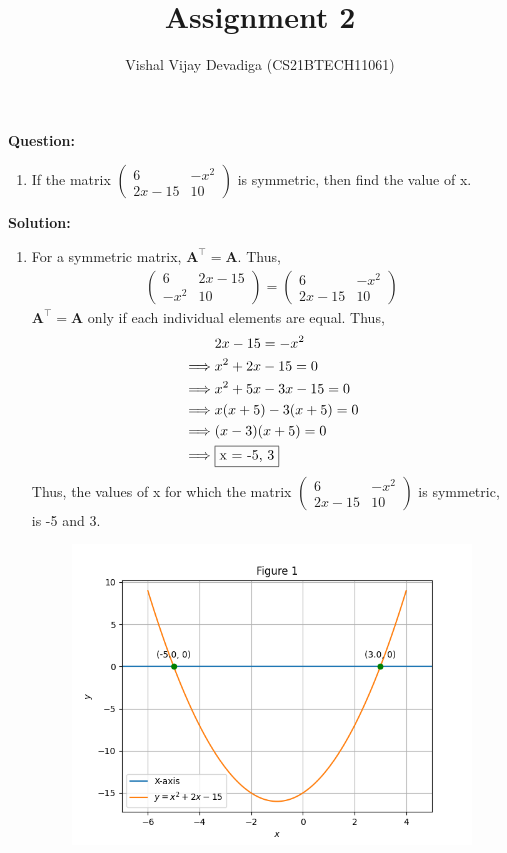 \documentclass[journal,12pt,twocolumn]{IEEEtran}
\title{Assignment 2}
\author{Vishal Vijay Devadiga (CS21BTECH11061)}
\date{}
\let\vec\mathbf
\newcommand{\myvec}[1]{\ensuremath{\begin{pmatrix}#1\end{pmatrix}}}
\newcommand{\question}{\noindent \textbf{Question: }}
\newcommand{\solution}{\noindent \textbf{Solution: }}
\begin{document}
\maketitle
\question
\begin{enumerate}[label=]
	\item If the matrix $\myvec{6 & -x^2 \\ 2x - 15 & 10}$ is symmetric, then find the value of x.
\end{enumerate}
\solution
\begin{enumerate}[label=]
	\item For a symmetric matrix, $\vec{A}^{\top} = \vec{A}$. Thus,
	\begin{align}
		\myvec{6 & 2x - 15 \\ -x^2 & 10} = \myvec{6 & -x^2 \\ 2x - 15 & 10}
	\end{align}
	$\vec{A}^{\top} = \vec{A}$ only if each individual elements are equal. Thus,
	\begin{align}
		&2x - 15 = -x^2
		\\
		\implies &x^2 + 2x - 15 = 0
		\label{eq:eq1}
		\\
		\implies &x^2 + 5x - 3x -15 = 0
		\\
		\implies &x(x+5) - 3(x+5) =0
		\\
		\implies &(x-3)(x+5) = 0
		\\
		\implies &\fbox{x = -5, 3}
		\label{eq:eq2}
	\end{align}
	Thus, the values of x for which the matrix $\myvec{6 & -x^2 \\ 2x - 15 & 10}$ is symmetric, is -5 and 3. \\
	\begin{figure}[h]
	\centering
	\includegraphics[scale = 0.6]{./figs/Figure.png}

\end{figure}
\end{enumerate}
\end{document}
